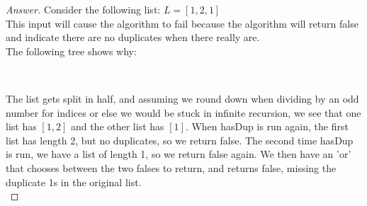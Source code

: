 \documentclass[11pt]{article}
\theoremstyle{definition}
\theoremstyle{definition}
\theoremstyle{definition}
\begin{document}
\begin{proof}[Answer]


Consider the following list: $L = [1, 2, 1]$\\
This input will cause the algorithm to fail because the algorithm will return false and indicate there are no duplicates when there really are.\\

The following tree shows why:\\

\begin{center}
	\\
\end{center}

The list gets split in half, and assuming we round down when dividing by an odd number for indices or else we would be stuck in infinite recursion, we see that one list has $[1, 2]$ and the other list has $[1]$. When hasDup is run again, the first list has length 2, but no duplicates, so we return false. The second time hasDup is run, we have a list of length 1, so we return false again. We then have an 'or' that chooses between the two falses to return, and returns false, missing the duplicate 1s in the original list.\\

\end{proof}

\end{document}
